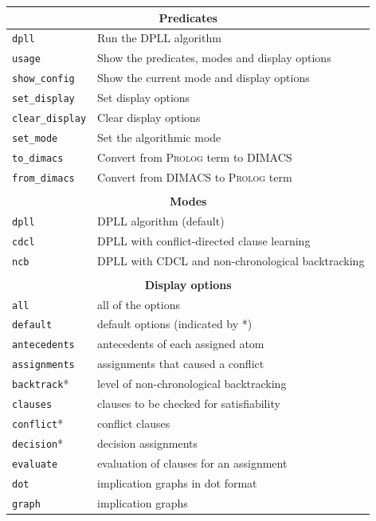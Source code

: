 \documentclass[11pt]{article}
\newcommand*{\p}[1]{\textup{\texttt{#1}}}
\newcommand*{\pl}{\textsc{Prolog}}
\begin{document}
\begin{center}
\begin{tabular}{|l|l|}
\hline
\multicolumn{2}{|c|}{\textbf{\large Predicates}}\\
\hline
\p{dpll}&Run the DPLL algorithm\\
\p{usage}&Show the predicates, modes and display options \\
\p{show\_config}&Show the current mode and display options\\
\p{set\_display}&Set display options\\
\p{clear\_display}&Clear display options\\
\p{set\_mode}&Set the algorithmic mode\\
\p{to\_dimacs}&Convert from \pl{} term to DIMACS\\
\p{from\_dimacs}&Convert from DIMACS to \pl{} term\\
\hline
\multicolumn{2}{c}{}\\
\hline
\multicolumn{2}{|c|}{\textbf{\large Modes}}\\
\hline
\p{dpll} & DPLL algorithm (default)\\
\p{cdcl} & DPLL with conflict-directed clause learning\\
\p{ncb} &  DPLL with CDCL and non-chronological backtracking\\
\hline
\multicolumn{2}{c}{}\\
\hline
\multicolumn{2}{|c|}{\textbf{\large Display options}}\\
\hline
\p{all}       &  all of the options\\
\p{default}   &  default options (indicated by *)\\
\hline
\p{antecedents}&  antecedents of each assigned atom\\
\p{assignments}& assignments that caused a conflict         \\
\p{backtrack}*&  level of non-chronological backtracking    \\
\p{clauses}   &  clauses to be checked for satisfiability   \\
\p{conflict}* &  conflict clauses                           \\
\p{decision}* &  decision assignments                       \\
\p{evaluate}  &  evaluation of clauses for an assignment    \\
\p{dot}       &  implication graphs in dot format           \\
\p{graph}     &  implication graphs                         \\

\end{tabular}
\end{center}
\end{document}
